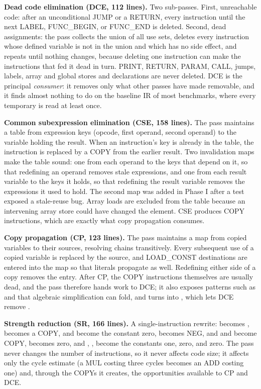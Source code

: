 \textbf{Dead code elimination (DCE, 112 lines).} Two sub-passes. First, unreachable code: after an unconditional JUMP or a RETURN, every instruction until the next LABEL, FUNC\_BEGIN, or FUNC\_END is deleted. Second, dead assignments: the pass collects the union of all use sets, deletes every instruction whose defined variable is not in the union and which has no side effect, and repeats until nothing changes, because deleting one instruction can make the instructions that fed it dead in turn. PRINT, RETURN, PARAM, CALL, jumps, labels, array and global stores and declarations are never deleted. DCE is the principal \emph{consumer}: it removes only what other passes have made removable, and it finds almost nothing to do on the baseline IR of most benchmarks, where every temporary is read at least once.

\textbf{Common subexpression elimination (CSE, 158 lines).} The pass maintains a table from expression keys (opcode, first operand, second operand) to the variable holding the result. When an instruction's key is already in the table, the instruction is replaced by a COPY from the earlier result. Two invalidation maps make the table sound: one from each operand to the keys that depend on it, so that redefining an operand removes stale expressions, and one from each result variable to the keys it holds, so that redefining the result variable removes the expressions it used to hold. The second map was added in Phase I after a test exposed a stale-reuse bug. Array loads are excluded from the table because an intervening array store could have changed the element. CSE produces COPY instructions, which are exactly what copy propagation consumes.

\textbf{Copy propagation (CP, 123 lines).} The pass maintains a map from copied variables to their sources, resolving chains transitively. Every subsequent use of a copied variable is replaced by the source, and LOAD\_CONST destinations are entered into the map so that literals propagate as well. Redefining either side of a copy removes the entry. After CP, the COPY instructions themselves are usually dead, and the pass therefore hands work to DCE; it also exposes patterns such as  and  that algebraic simplification can fold, and turns  into , which lets DCE remove .

\textbf{Strength reduction (SR, 166 lines).} A single-instruction rewrite:  becomes ,  becomes a COPY,  and  become the constant zero,  becomes NEG,  and  and  become COPY,  becomes zero, and , ,  become the constants one, zero, and zero. The pass never changes the number of instructions, so it never affects code size; it affects only the cycle estimate (a MUL costing three cycles becomes an ADD costing one) and, through the COPYs it creates, the opportunities available to CP and DCE.

